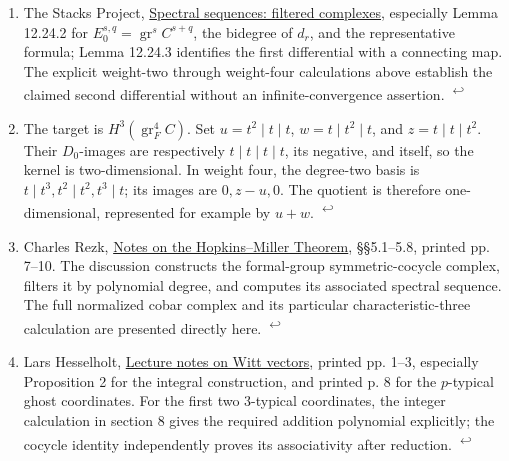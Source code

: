 \documentclass[11pt,letterpaper]{article}
\begin{document}
\begingroup\small
\begin{enumerate}[leftmargin=1.8em,label=\arabic*.,itemsep=.8em]
\item \hypertarget{note-filtered-complex}{}The Stacks Project, \href{https://stacks.math.columbia.edu/tag/012K}{Spectral sequences: filtered complexes}, especially Lemma 12.24.2 for \(
E_0^{s,q}=\operatorname{gr}^s C^{s+q}
\), the bidegree of \(
d_r
\), and the representative formula; Lemma 12.24.3 identifies the first differential with a connecting map. The explicit weight-two through weight-four calculations above establish the claimed second differential without an infinite-convergence assertion. \hyperlink{citation-filtered-complex-1}{\textsuperscript{\(\hookleftarrow\)}}
\item \hypertarget{note-outgoing-target}{}The target is \(
H^3(\operatorname{gr}_F^4C)
\). Set \(
u=t^2\mid t\mid t
\), \(
w=t\mid t^2\mid t
\), and \(
z=t\mid t\mid t^2
\). Their \(
D_0
\)-images are respectively \(
t\mid t\mid t\mid t
\), its negative, and itself, so the kernel is two-dimensional. In weight four, the degree-two basis is \(
t\mid t^3,t^2\mid t^2,t^3\mid t
\); its images are \(
0,z-u,0
\). The quotient is therefore one-dimensional, represented for example by \(
u+w
\). \hyperlink{citation-outgoing-target-1}{\textsuperscript{\(\hookleftarrow\)}}
\item \hypertarget{note-rezk}{}Charles Rezk, \href{https://www.sas.rochester.edu/mth/sites/doug-ravenel/otherpapers/hopkins-miller-thm.pdf}{Notes on the Hopkins–Miller Theorem}, §§5.1–5.8, printed pp. 7–10. The discussion constructs the formal-group symmetric-cocycle complex, filters it by polynomial degree, and computes its associated spectral sequence. The full normalized cobar complex and its particular characteristic-three calculation are presented directly here. \hyperlink{citation-rezk-1}{\textsuperscript{\(\hookleftarrow\)}}
\item \hypertarget{note-witt}{}Lars Hesselholt, \href{https://math.mit.edu/~larsh/papers/s03/wittsurvey.pdf}{Lecture notes on Witt vectors}, printed pp. 1–3, especially Proposition 2 for the integral construction, and printed p. 8 for the \(
p
\)-typical ghost coordinates. For the first two \(
3
\)-typical coordinates, the integer calculation in section 8 gives the required addition polynomial explicitly; the cocycle identity independently proves its associativity after reduction. \hyperlink{citation-witt-1}{\textsuperscript{\(\hookleftarrow\)}}
\end{enumerate}
\endgroup
\end{document}
